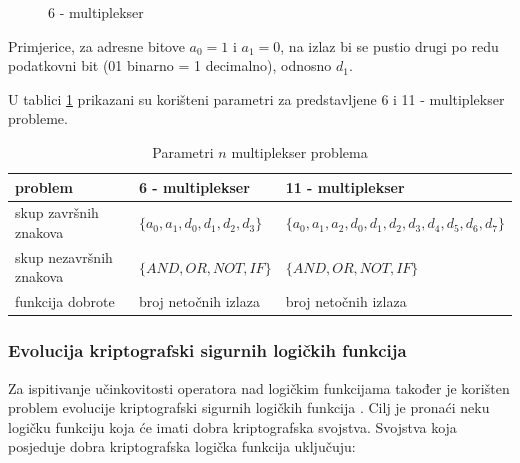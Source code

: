 \begin{figure}[H]
\centering
{}
\label{muxPicture}
\caption{6 - multiplekser}
\end{figure}

Primjerice, za adresne bitove $a_0=1$ i $a_1=0$, na izlaz bi se pustio drugi po redu podatkovni bit (01 binarno = 1 decimalno), odnosno $d_1$.

U tablici \ref{muxTable} prikazani su korišteni parametri za predstavljene 6 i 11 - multiplekser probleme.

\begin{table}[H]
 	\centering

    \begin{tabular}{| l | l | l |}
    \hline
   problem & 6 - multiplekser & 11 - multiplekser \\ \hline
   skup završnih znakova & $\{a_0, a_1, d_0, d_1, d_2, d_3 \}$ & $\{a_0, a_1, a_2, d_0, d_1, d_2, d_3, d_4, d_5, d_6, d_7 \}$\\ \hline
   skup nezavršnih znakova & $\{ AND, OR, NOT, IF \}$  & $\{ AND, OR, NOT, IF \}$ \\ \hline
   funkcija dobrote & broj netočnih izlaza & broj netočnih izlaza \\ \hline
    \end{tabular}
    
    \caption{Parametri $n$ multiplekser problema}
    \label{muxTable}
\end{table}

\subsubsection{Evolucija kriptografski sigurnih logičkih funkcija}
Za ispitivanje učinkovitosti operatora nad logičkim funkcijama također je korišten problem evolucije kriptografski sigurnih logičkih funkcija \cite{bool}. Cilj je pronaći neku logičku funkciju koja će imati dobra kriptografska svojstva. Svojstva koja posjeduje dobra kriptografska logička funkcija uključuju:

